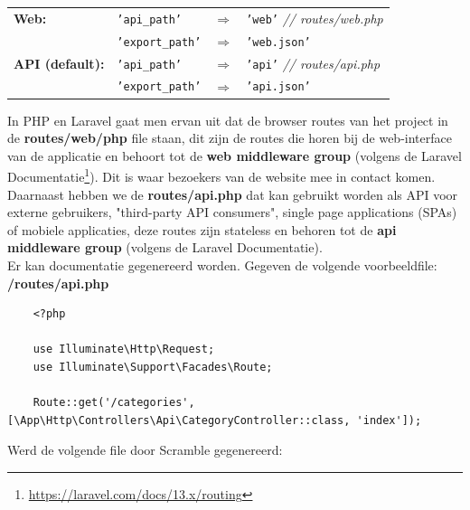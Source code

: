 \begin{tcolorbox}[colback=gray!20, colframe=gray!80]
\begin{tabular}{l l c l}
    \textbf{Web:} 
    & \texttt{'api\_path'}    & $\Rightarrow$ & \texttt{'web'}      \quad \textit{// routes/web.php} \\
    & \texttt{'export\_path'} & $\Rightarrow$ & \texttt{'web.json'} \\[1.5em]
    
    \textbf{API (default):} 
    & \texttt{'api\_path'}    & $\Rightarrow$ & \texttt{'api'}      \quad \textit{// routes/api.php} \\
    & \texttt{'export\_path'} & $\Rightarrow$ & \texttt{'api.json'} \\
\end{tabular}
\end{tcolorbox}

In PHP en Laravel gaat men ervan uit dat de browser routes van het project in de \textbf{routes/web/php} file staan, dit zijn de routes die horen bij de web-interface van de applicatie en behoort tot de \textbf{web middleware group} (volgens de Laravel Documentatie\footnote{\href{https://laravel.com/docs/13.x/routing}{https://laravel.com/docs/13.x/routing}}). Dit is waar bezoekers van de website mee in contact komen.\\

Daarnaast hebben we de \textbf{routes/api.php} dat kan gebruikt worden als API voor externe gebruikers, "third-party API consumers", single page applications (SPAs) of mobiele applicaties, deze routes zijn stateless en behoren tot de \textbf{api middleware group} (volgens de Laravel Documentatie). \\

Er kan documentatie gegenereerd worden. Gegeven de volgende voorbeeldfile: \\

\textbf{/routes/api.php}
\begin{verbatim}
    <?php
    
    use Illuminate\Http\Request;
    use Illuminate\Support\Facades\Route;
    
    Route::get('/categories', [\App\Http\Controllers\Api\CategoryController::class, 'index']);
\end{verbatim}

Werd de volgende file door Scramble gegenereerd: \\

